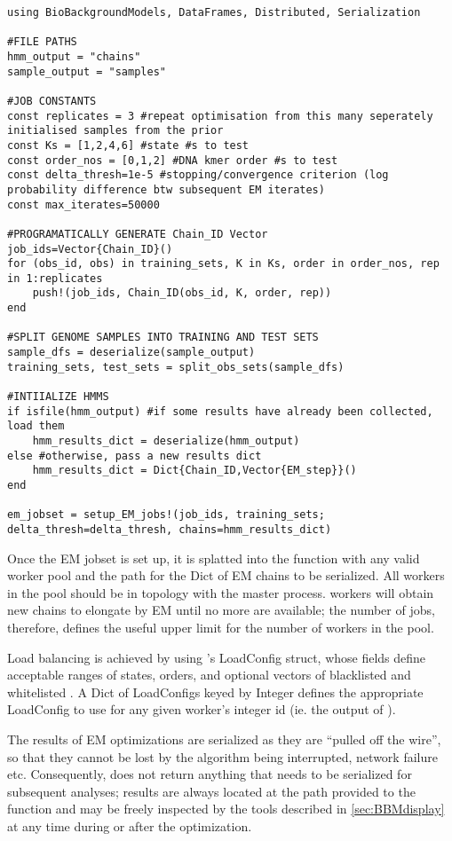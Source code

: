 \begin{verbatim}
using BioBackgroundModels, DataFrames, Distributed, Serialization

#FILE PATHS
hmm_output = "chains"
sample_output = "samples"

#JOB CONSTANTS
const replicates = 3 #repeat optimisation from this many seperately initialised samples from the prior
const Ks = [1,2,4,6] #state #s to test
const order_nos = [0,1,2] #DNA kmer order #s to test
const delta_thresh=1e-5 #stopping/convergence criterion (log probability difference btw subsequent EM iterates)
const max_iterates=50000

#PROGRAMATICALLY GENERATE Chain_ID Vector
job_ids=Vector{Chain_ID}()
for (obs_id, obs) in training_sets, K in Ks, order in order_nos, rep in 1:replicates
    push!(job_ids, Chain_ID(obs_id, K, order, rep))
end

#SPLIT GENOME SAMPLES INTO TRAINING AND TEST SETS
sample_dfs = deserialize(sample_output)
training_sets, test_sets = split_obs_sets(sample_dfs)

#INTIIALIZE HMMS
if isfile(hmm_output) #if some results have already been collected, load them
    hmm_results_dict = deserialize(hmm_output)
else #otherwise, pass a new results dict
    hmm_results_dict = Dict{Chain_ID,Vector{EM_step}}()
end

em_jobset = setup_EM_jobs!(job_ids, training_sets; delta_thresh=delta_thresh, chains=hmm_results_dict)
\end{verbatim}

Once the EM jobset is set up, it is splatted into the  function with any valid worker pool and the path for the Dict of EM chains to be serialized. All workers in the pool should be in  topology with the master process.  workers will obtain new chains to elongate by EM until no more are available; the number of jobs, therefore, defines the useful upper limit for the number of workers in the pool.

Load balancing is achieved by using 's LoadConfig struct, whose fields define acceptable ranges of states, orders, and optional vectors of blacklisted and whitelisted . A Dict of LoadConfigs keyed by Integer defines the appropriate LoadConfig to use for any given worker's integer id (ie. the output of ).

The results of EM optimizations are serialized as they are ``pulled off the wire'', so that they cannot be lost by the algorithm being interrupted, network failure etc. Consequently,  does not return anything that needs to be serialized for subsequent analyses; results are always located at the path provided to the function and may be freely inspected by the tools described in \autoref{sec:BBMdisplay} at any time during or after the optimization.

